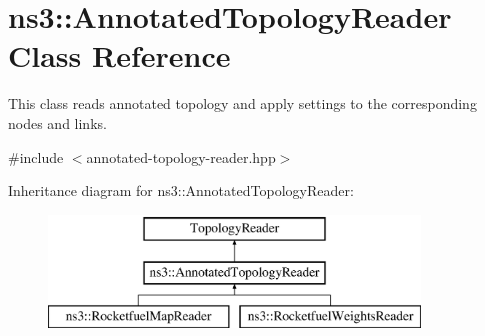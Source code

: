 \hypertarget{classns3_1_1AnnotatedTopologyReader}{}\section{ns3\+:\+:Annotated\+Topology\+Reader Class Reference}
\label{classns3_1_1AnnotatedTopologyReader}


This class reads annotated topology and apply settings to the corresponding nodes and links.  




{\ttfamily \#include $<$annotated-\/topology-\/reader.\+hpp$>$}

Inheritance diagram for ns3\+:\+:Annotated\+Topology\+Reader\+:\begin{figure}[H]
\begin{center}
\leavevmode
\includegraphics[height=3.000000cm]{classns3_1_1AnnotatedTopologyReader}
\end{center}
\end{figure}
